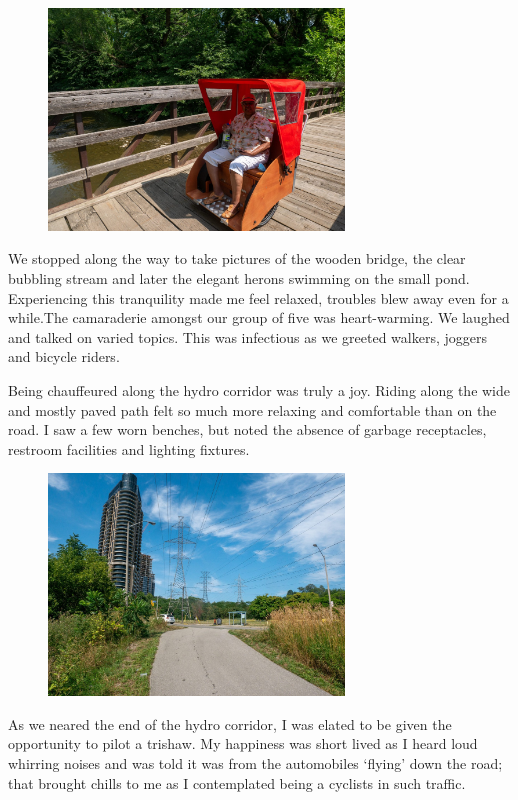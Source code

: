 \documentclass[letter]{ourGreenwayBrand}
\begin{document}
\begin{figure}[htbp]
  \centering
  \includegraphics[width=0.7\textwidth]{images/1220575-2048x1538.jpg}
\end{figure}

We stopped along the way to take pictures of the wooden bridge, the clear bubbling stream and later the elegant herons swimming on the small pond. Experiencing this tranquility made me feel relaxed, troubles blew away even for a while.The camaraderie amongst our group of five was heart-warming. We laughed and talked on varied topics. This was infectious as we greeted walkers, joggers and bicycle riders.

Being chauffeured along the hydro corridor was truly a joy. Riding along the wide and mostly paved path felt so much more relaxing and comfortable than on the road. I saw a few worn benches, but noted the absence of garbage receptacles, restroom facilities and lighting fixtures.

\begin{figure}[htbp]
  \centering
  \includegraphics[width=0.7\textwidth]{images/1220586-2048x1538-1.jpg}
\end{figure}

As we neared the end of the hydro corridor, I was elated to be given the opportunity to pilot a trishaw. My happiness was short lived as I heard loud whirring noises and was told it was from the automobiles ‘flying’ down the road; that brought chills to me as I contemplated being a cyclists in such traffic.
\end{document}
